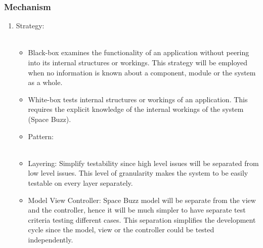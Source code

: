 	\subsubsection*{Mechanism}
		\begin{enumerate}
			\item Strategy:\\\\
		\begin{itemize}
			\item	Black-box examines the functionality of an application without peering into its internal structures or workings. This strategy will be employed when no information is known about a component, module or the system as a whole.
			\item	White-box tests internal structures or workings of an application. This requires the explicit knowledge of the internal workings of the system (Space Buzz).
		\end{itemize}
		
		\begin{itemize}
			 \item Pattern:\\\\
			\item	Layering:  Simplify testability since high level issues will be separated from low level issues. This level of granularity makes the system to be easily testable on every layer separately.
			\item Model View Controller: Space Buzz model will be separate from the view and the controller, hence it will be much simpler to have separate test criteria testing different cases. This separation simplifies the development cycle since the model, view or the controller could be tested independently. 
		\end{itemize}
\end{enumerate}